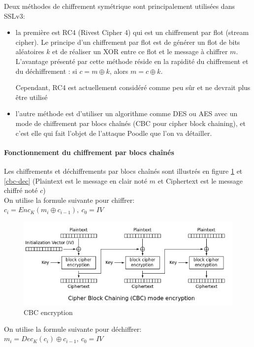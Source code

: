 Deux méthodes de chiffrement symétrique sont principalement utilisées dans SSLv3:
\begin{itemize}
\item la première est RC4 (Rivest Cipher 4) qui est un chiffrement par flot (stream cipher). Le principe d'un chiffrement par flot est de générer un flot de bits aléatoires $k$ et de réaliser un XOR entre ce flot et le message à chiffrer $m$. L'avantage présenté par cette méthode réside en la rapidité du chiffrement et du déchiffrement : si $c = m \oplus k$, alors $m = c \oplus k$. 

Cependant, RC4 est actuellement considéré comme peu s\^ur et ne devrait plus \^etre utilisé
\item l'autre méthode est d'utiliser un algorithme comme DES ou AES avec un mode de chiffrement par blocs cha\^inés (CBC pour cipher block chaining), et c'est elle qui fait l'objet de l'attaque Poodle que l'on va détailler.
\end{itemize}

\paragraph{Fonctionnement du chiffrement par blocs cha\^inés}

Les chiffrements et déchiffrements par blocs cha\^inés sont illustrés en figure \ref{cbc-enc} et \ref{cbc-dec} (Plaintext est le message en clair noté $m$ et Ciphertext est le message chiffré noté $c$) \\

\noindent On utilise la formule suivante pour chiffrer: \\
$c_i = Enc_K(m_i \oplus c_{i-1}),\ c_0 = IV$

\begin{figure}[H]
\centering
\includegraphics[scale=0.6]{img/cbc-enc.png}
\caption{CBC encryption}
\label{cbc-enc}
\end{figure}

\noindent On utilise la formule suivante pour déchiffrer: \\
$m_i = Dec_K(c_i) \oplus c_{i-1},\ c_0 = IV$ 

